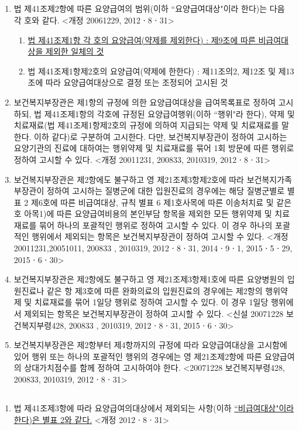 \subsection{}
\begin{enumerate}[①]\tightlist
\item 법 제41조제2항에 따른 \large{요양급여의 범위(이하 ``요양급여대상"이라 한다)는 다음 각 호와 같다.} <개정 2006\cntrdot{}12\cntrdot{}29, 2012ㆍ8ㆍ31>
	\begin{enumerate}[1.]\tightlist
	\item \uline{법 제41조제1항 각 호의 요양급여(약제를 제외한다) : 제9조에 따른 비급여대상을 제외한 일체의 것}
	\item 법 제41조제1항제2호의 요양급여(약제에 한한다) : 제11조의2, 제12조 및 제13조에 따라 요양급여대상으로 결정 또는 조정되어 고시된 것
	\end{enumerate}
\item 보건복지부장관은 제1항의 규정에 의한 요양급여대상을 급여목록표로 정하여 고시하되, 법 제41조제1항의 각호에 규정된 요양급여행위(이하 ``행위"라 한다), 약제 및 치료재료(법 제41조제1항제2호의 규정에 의하여 지급되는 약제 및 치료재료를 말한다. 이하 같다)로 구분하여 고시한다. 다만, 보건복지부장관이 정하여 고시하는 요양기관의 진료에 대하여는 행위\cntrdot{}약제 및 치료재료를 묶어 1회 방문에 따른 행위로 정하여 고시할 수 있다. <개정 2001\cntrdot{}12\cntrdot{}31, 2008\cntrdot{}3\cntrdot{}3, 2010\cntrdot{}3\cntrdot{}19, 2012ㆍ8ㆍ31>
\item 보건복지부장관은 제2항에도 불구하고 영 제21조제3항제2호에 따라 보건복지가족부장관이 정하여 고시하는 질병군에 대한 입원진료의 경우에는 해당 질병군별로 별표 2 제6호에 따른 비급여대상, 규칙 별표 6 제1호사목에 따른 이송처치료 및 같은 호 아목1)에 따른 요양급여비용의 본인부담 항목을 제외한 모든 행위\cntrdot{}약제 및 치료재료를 묶어 하나의 포괄적인 행위로 정하여 고시할 수 있다. 이 경우 하나의 포괄적인 행위에서 제외되는 항목은 보건복지부장관이 정하여 고시할 수 있다. <개정 2001\cntrdot{}12\cntrdot{}31,2005\cntrdot{}10\cntrdot{}11, 2008\cntrdot{}3\cntrdot{}3 , 2010\cntrdot{}3\cntrdot{}19, 2012ㆍ8ㆍ31, 2014ㆍ9ㆍ1, 2015ㆍ5ㆍ29, 2015ㆍ6ㆍ30>
\item 보건복지부장관은 제2항에도 불구하고 영 제21조제3항제1호에 따른 요양병원의 입원진료나 같은 항 제3호에 따른 완화의료의 입원진료의 경우에는 제2항의 행위\cntrdot{}약제 및 치료재료를 묶어 1일당 행위로 정하여 고시할 수 있다. 이 경우 1일당 행위에서 제외되는 항목은 보건복지부장관이 정하여 고시할 수 있다. <신설 2007\cntrdot{}12\cntrdot{}28 보건복지부령428, 2008\cntrdot{}3\cntrdot{}3 , 2010\cntrdot{}3\cntrdot{}19, 2012ㆍ8ㆍ31, 2015ㆍ6ㆍ30>
\item 보건복지부장관은 제2항부터 제4항까지의 규정에 따라 요양급여대상을 고시함에 있어 행위 또는 하나의 포괄적인 행위의 경우에는 영 제21조제2항에 따른 요양급여의 상대가치점수를 함께 정하여 고시하여야 한다. <2007\cntrdot{}12\cntrdot{}28 보건복지부령428, 2008\cntrdot{}3\cntrdot{}3, 2010\cntrdot{}3\cntrdot{}19, 2012ㆍ8ㆍ31>
\end{enumerate}  
\subsection{}
\begin{enumerate}[①]\tightlist
\item 법 제41조제3항에 따라 요양급여의대상에서 제외되는 사항(이하 \uline{``비급여대상"이라 한다)은 별표 2와 같다.} <개정 2012ㆍ8ㆍ31>
\end{enumerate}